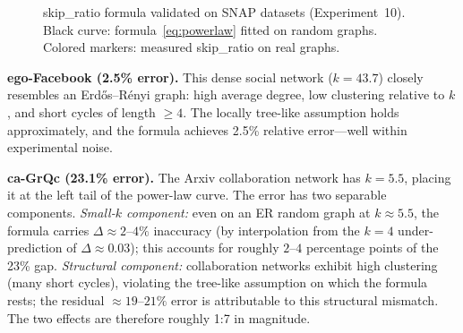 \documentclass[conference]{IEEEtran}
\begin{document}
\begin{figure}[t]
\centering
{}
\caption{skip\_ratio formula validated on SNAP datasets (Experiment~10).
Black curve: formula~\eqref{eq:powerlaw} fitted on random graphs.
Colored markers: measured skip\_ratio on real graphs.}
\label{fig:overlay}
\end{figure}

\noindent\textbf{ego-Facebook (2.5\% error).}
This dense social network ($k=43.7$) closely resembles an
Erd\H{o}s--R\'enyi graph: high average degree, low clustering relative
to $k$, and short cycles of length $\geq 4$.  The locally tree-like
assumption holds approximately, and the formula achieves 2.5\% relative
error---well within experimental noise.

\noindent\textbf{ca-GrQc (23.1\% error).}
The Arxiv collaboration network has $k=5.5$, placing it at the left tail
of the power-law curve.  The error has two separable components.
\emph{Small-$k$ component:} even on an ER random graph at $k\approx 5.5$,
the formula carries $\Delta\approx 2$--$4\%$ inaccuracy (by interpolation
from the $k=4$ under-prediction of $\Delta\approx 0.03$); this accounts
for roughly $2$--$4$ percentage points of the 23\% gap.
\emph{Structural component:} collaboration networks exhibit high clustering
(many short cycles), violating the tree-like assumption on which the
formula rests; the residual $\approx 19$--$21\%$ error is attributable to
this structural mismatch.  The two effects are therefore roughly 1:7 in magnitude.
\end{document}
